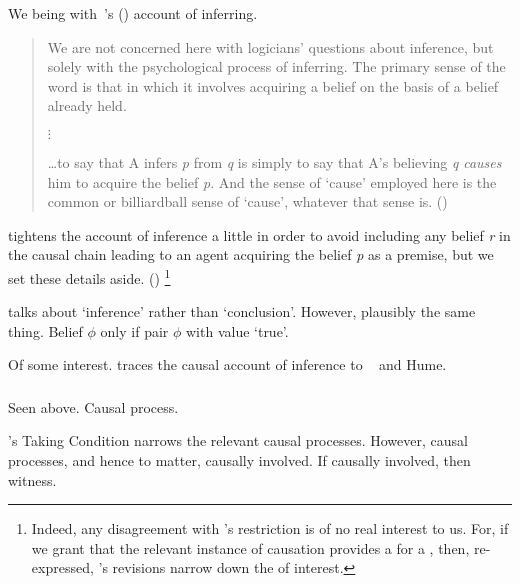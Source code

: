 \begin{note}
  We being with~\cite{Armstrong:1968vh}'s (\citeyear{Armstrong:1968vh}) account of inferring.

  \begin{quote}
    We are not concerned here with logicians' questions about inference, but solely with the psychological process of inferring.
    The primary sense of the word is that in which it involves acquiring a belief on the basis of a belief already held.

    \mbox{}\hfill\(\vdots\)\hfill\mbox{}

    \dots to say that A infers \emph{p} from \emph{q} is simply to say that A's believing \emph{q} \emph{causes} him to acquire the belief \emph{p}.
    And the sense of `cause' employed here is the common or billiardball sense of `cause', whatever that sense is.%
    \mbox{}\hfill\mbox{(\citeyear[194]{Armstrong:1968vh})}
  \end{quote}

  \citeauthor{Armstrong:1968vh} tightens the account of inference a little in order to avoid including any belief \emph{r} in the causal chain leading to an agent acquiring the belief \emph{p} as a premise, but we set these details aside.
  (\citeyear[195--197]{Armstrong:1968vh})%
  \footnote{
    Indeed, any disagreement with \citeauthor{Armstrong:1968vh}'s restriction is of no real interest to us.
    For, if we grant that the relevant instance of causation provides a \wit{} for a \ros{}, then, re-expressed, \citeauthor{Armstrong:1968vh}'s revisions narrow down the  of interest.
  }

  \citeauthor{Armstrong:1968vh} talks about `inference' rather than `conclusion'.
  However, plausibly the same thing.
  Belief \(\phi\) only if pair \(\phi\) with value `true'.
\end{note}

\begin{note}
  Of some interest.
  \citeauthor{Armstrong:1968vh} traces the causal account of inference to ~\citeauthor{Moore:1962up} and Hume.
\end{note}

\subsubsection{\textcite{Boghossian:2014aa}}

\begin{note}
  Seen above.
  Causal process.

  \citeauthor{Boghossian:2014aa}'s Taking Condition narrows the relevant causal processes.
  However, causal processes, and hence to matter, causally involved.
  If causally involved, then witness.
\end{note}

